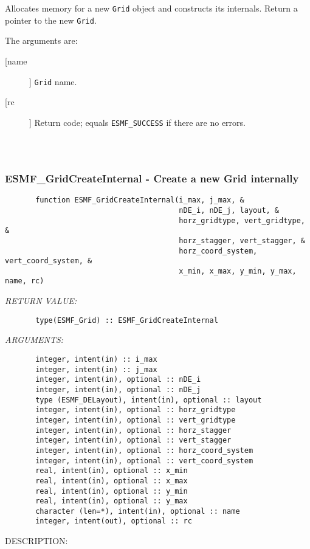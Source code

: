        Allocates memory for a new {\tt Grid} object and constructs its
       internals.  Return a pointer to the new {\tt Grid}.
  
       The arguments are:
       \begin{description}
       \item[[name]]
            {\tt Grid} name.
       \item[[rc]]
            Return code; equals {\tt ESMF\_SUCCESS} if there are no errors.
     \end{description}
  
\begin{verbatim} \end{verbatim}
 
 
\mbox{}\hrulefill\ 
 
\subsubsection{ESMF\_GridCreateInternal - Create a new Grid internally}


\begin{verbatim}       function ESMF_GridCreateInternal(i_max, j_max, &
                                        nDE_i, nDE_j, layout, &
                                        horz_gridtype, vert_gridtype, &
                                        horz_stagger, vert_stagger, &
                                        horz_coord_system, vert_coord_system, &
                                        x_min, x_max, y_min, y_max, name, rc)\end{verbatim}{\em RETURN VALUE:}
\begin{verbatim}       type(ESMF_Grid) :: ESMF_GridCreateInternal\end{verbatim}{\em ARGUMENTS:}
\begin{verbatim}       integer, intent(in) :: i_max
       integer, intent(in) :: j_max
       integer, intent(in), optional :: nDE_i
       integer, intent(in), optional :: nDE_j
       type (ESMF_DELayout), intent(in), optional :: layout
       integer, intent(in), optional :: horz_gridtype
       integer, intent(in), optional :: vert_gridtype
       integer, intent(in), optional :: horz_stagger
       integer, intent(in), optional :: vert_stagger
       integer, intent(in), optional :: horz_coord_system
       integer, intent(in), optional :: vert_coord_system
       real, intent(in), optional :: x_min
       real, intent(in), optional :: x_max
       real, intent(in), optional :: y_min
       real, intent(in), optional :: y_max
       character (len=*), intent(in), optional :: name
       integer, intent(out), optional :: rc\end{verbatim}
{\sf DESCRIPTION:\\ }


